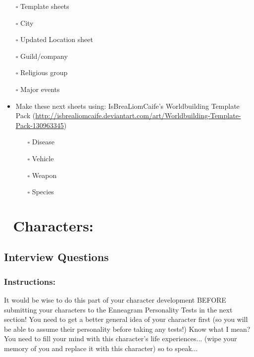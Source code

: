 \documentclass[openleft,oneside,showtrims]{memoir}
\begin{document}
\begin{itemize}
\item[{$\square$}] Template sheets

\item[{$\square$}] City

\item[{$\square$}] Updated Location sheet

\item[{$\square$}] Guild/company

\item[{$\square$}] Religious group

\item[{$\square$}] Major events

\item Make these next sheets using: IsBreaLiomCaife’s Worldbuilding Template Pack (\url{http://isbrealiomcaife.deviantart.com/art/Worldbuilding-Template-Pack-130963345})
\begin{itemize}
\item[{$\square$}] Disease

\item[{$\square$}] Vehicle

\item[{$\square$}] Weapon

\item[{$\square$}] Species
\end{itemize}
\end{itemize}
\section{👤 Characters:}
\label{sec:orgf6a98a9}

\subsection{Interview Questions}
\label{sec:org9b2aa56}

\subsubsection*{Instructions:}
\label{sec:org0567d94}

It would be wise to do this part of your character development BEFORE submitting your characters to the Enneagram Personality Tests in the next section!  You need to get a better general idea of your character first (so you will be able to assume their personality before taking any tests!) Know what I mean? You need to fill your mind with this character's life experiences... (wipe your memory of you and replace it with this character) so to speak...
\end{document}
